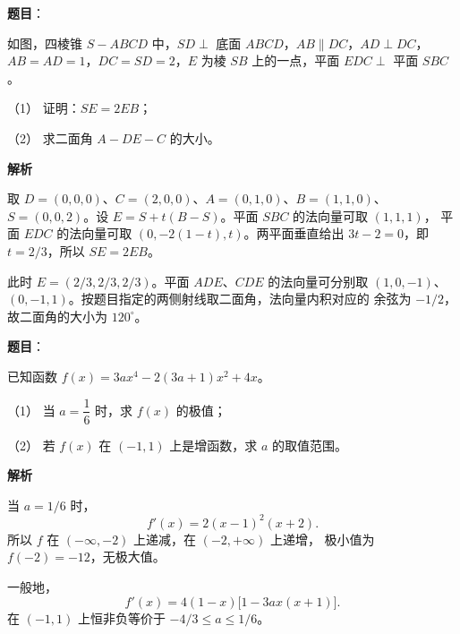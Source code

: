 \begin{answer}

\textbf{题目}：

如图，四棱锥 $S-ABCD$ 中，$SD\perp$ 底面 $ABCD$，$AB\parallel DC$，$AD\perp DC$，$AB=AD=1$，$DC=SD=2$，$E$ 为棱 $SB$ 上的一点，平面 $EDC\perp$ 平面 $SBC$。
\nopagebreak[4]
\begin{center}\end{center}
\nopagebreak[4]
（1） 证明：$SE=2EB$；

（2） 求二面角 $A-DE-C$ 的大小。

\textbf{解析}


取 $D=(0,0,0)$、$C=(2,0,0)$、$A=(0,1,0)$、$B=(1,1,0)$、
$S=(0,0,2)$。设 $E=S+t(B-S)$。平面 $SBC$ 的法向量可取 $(1,1,1)$，
平面 $EDC$ 的法向量可取 $(0,-2(1-t),t)$。两平面垂直给出
$3t-2=0$，即 $t=2/3$，所以 $SE=2EB$。


此时 $E=(2/3,2/3,2/3)$。平面 $ADE\text{、}CDE$ 的法向量可分别取
$(1,0,-1)$、$(0,-1,1)$。按题目指定的两侧射线取二面角，法向量内积对应的
余弦为 $-1/2$，故二面角的大小为 $120^\circ$。



\end{answer}
\begin{answer}

\textbf{题目}：

已知函数 $f(x)=3ax^4-2(3a+1)x^2+4x$。

（1） 当 $a=\dfrac16$ 时，求 $f(x)$ 的极值；

（2） 若 $f(x)$ 在 $(-1,1)$ 上是增函数，求 $a$ 的取值范围。

\textbf{解析}


当 $a=1/6$ 时，
\nopagebreak[4]
\[
f'(x)=2(x-1)^2(x+2).
\]
所以 $f$ 在 $(-\infty,-2)$ 上递减，在 $(-2,+\infty)$ 上递增，
极小值为 $f(-2)=-12$，无极大值。


一般地，
\nopagebreak[4]
\[
f'(x)=4(1-x)\bigl[1-3ax(x+1)\bigr].
\]
在 $(-1,1)$ 上恒非负等价于
$-4/3\leq a\leq1/6$。



\end{answer}
